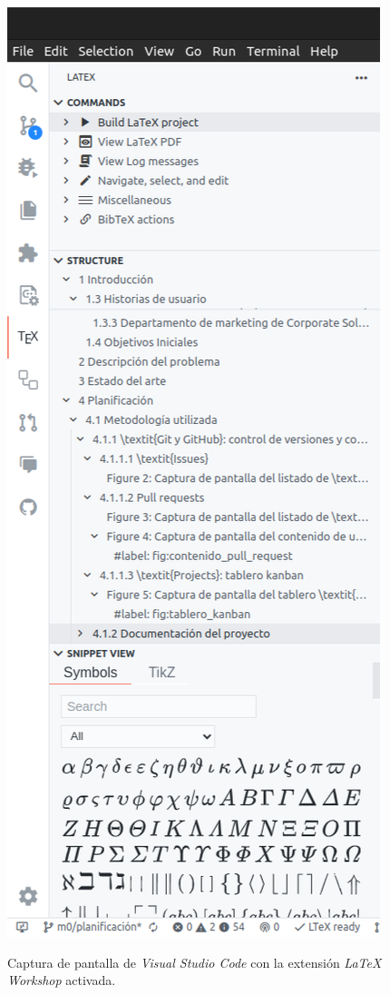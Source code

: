 \begin{figure}[H]
    \caption{Captura de pantalla de \textit{Visual Studio Code} con la extensión \textit{LaTeX Workshop} activada.}
    \centering
    \vspace*{0.5cm}
    \includegraphics[scale=0.2]{figuras/latex_workshop_extension.png}\label{fig:latex_workshop_extension}
\end{figure}

